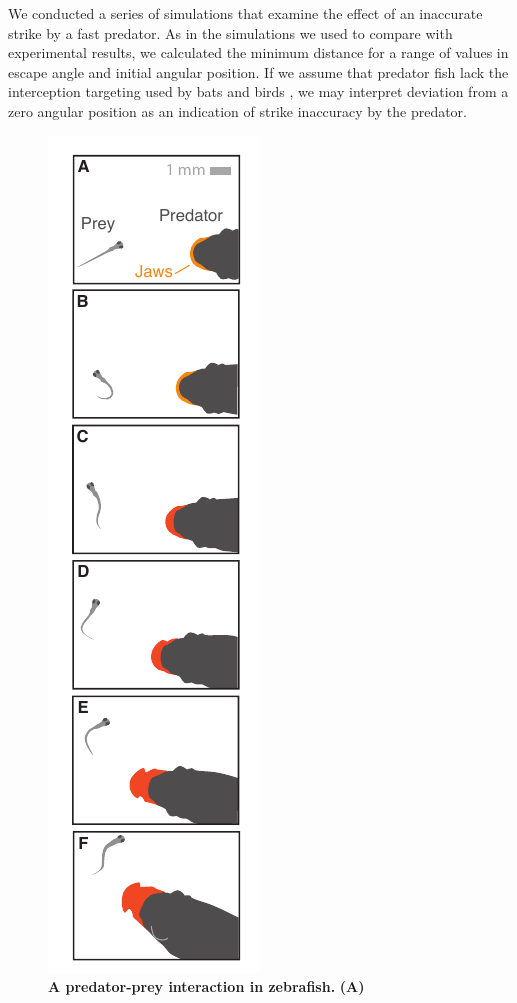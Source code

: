 \documentclass[12pt]{article}
\begin{document}
We conducted a series of simulations that examine the effect of an inaccurate strike by a fast predator. As in the simulations we used to compare with experimental results, we calculated the minimum distance for a range of values in escape angle and initial angular position. If we assume that predator fish lack the interception targeting used by bats \cite{Ghose:2006dk} and birds \cite{Kane:2014fs}, we may interpret deviation from a zero angular position as an indication of strike inaccuracy by the predator. 


\pagebreak




\pagebreak
\begin{figure}	
\includegraphics[width=.35\textwidth]{Fig_01.pdf}
\centering	
\caption{\textbf{A predator-prey interaction in zebrafish.} \textbf{(A)}  }
\label{pred_prey}
\end{figure}
\end{document}
